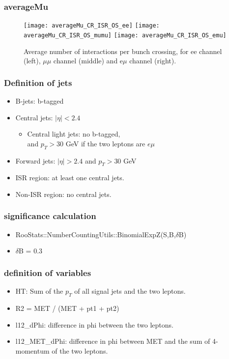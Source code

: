 \documentclass[mathserif,serif]{beamer}
\begin{document}
\begin{frame}
\frametitle{averageMu}
\begin{figure}
\texttt{[image: averageMu\_CR\_ISR\_OS\_ee]}
\texttt{[image: averageMu\_CR\_ISR\_OS\_mumu]}
\texttt{[image: averageMu\_CR\_ISR\_OS\_emu]} \\
\caption{Average number of interactions per bunch crossing, for ee channel (left), $\mu\mu$ channel (middle) and e$\mu$ channel (right).}
\end{figure}
\end{frame}

\begin{frame}
\frametitle{Definition of jets}
\normalsize
\begin{itemize}
\item B-jets: b-tagged
\item Central jets: $|\eta|<2.4$
\begin{itemize}
\item Central light jets: no b-tagged,\\
and $p_T>30$ GeV if the two leptons are $e\mu$
\end{itemize}
\item Forward jets: $|\eta|>2.4$ and $p_T>30$ GeV
\item ISR region: at least one central jets.
\item Non-ISR region: no central jets.
\end{itemize}
\end{frame}

\begin{frame}
\frametitle{significance calculation}
\begin{itemize}
\item RooStats::NumberCountingUtils::BinomialExpZ(S,B,$\delta$B)
\item $\delta$B = 0.3
\end{itemize}
\end{frame}

\begin{frame}
\frametitle{definition of variables}
\normalsize
\begin{itemize}
\item HT: Sum of the $p_T$ of all signal jets and the two leptons.
\item R2 = MET / (MET + pt1 + pt2)
\item l12\_dPhi: difference in phi between the two leptons.
\item l12\_MET\_dPhi: difference in phi between MET and the sum of 4-momentum of the two leptons.
\end{itemize}
\end{frame}
\end{document}
